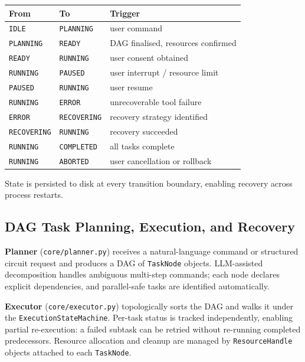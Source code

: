 \documentclass[11pt,a4paper]{article}
\begin{document}
\begin{center}
\small
\renewcommand{\arraystretch}{1.15}
\begin{tabular}{@{}lll@{}}
\toprule
\textbf{From} & \textbf{To} & \textbf{Trigger} \\
\midrule
\texttt{IDLE}       & \texttt{PLANNING}  & user command \\
\texttt{PLANNING}   & \texttt{READY}     & DAG finalised, resources confirmed \\
\texttt{READY}      & \texttt{RUNNING}   & user consent obtained \\
\texttt{RUNNING}    & \texttt{PAUSED}    & user interrupt / resource limit \\
\texttt{PAUSED}     & \texttt{RUNNING}   & user resume \\
\texttt{RUNNING}    & \texttt{ERROR}     & unrecoverable tool failure \\
\texttt{ERROR}      & \texttt{RECOVERING} & recovery strategy identified \\
\texttt{RECOVERING} & \texttt{RUNNING}   & recovery succeeded \\
\texttt{RUNNING}    & \texttt{COMPLETED} & all tasks complete \\
\texttt{RUNNING}    & \texttt{ABORTED}   & user cancellation or rollback \\
\bottomrule
\end{tabular}
\end{center}

State is persisted to disk at every transition boundary, enabling recovery across
process restarts.

\subsection{DAG Task Planning, Execution, and Recovery}

\textbf{Planner} (\texttt{core/planner.py}) receives a natural-language command or
structured circuit request and produces a DAG of \texttt{TaskNode} objects.
LLM-assisted decomposition handles ambiguous multi-step commands; each node
declares explicit dependencies, and parallel-safe tasks are identified
automatically.

\textbf{Executor} (\texttt{core/executor.py}) topologically sorts the DAG and
walks it under the \texttt{ExecutionStateMachine}. Per-task status is tracked
independently, enabling partial re-execution: a failed subtask can be retried
without re-running completed predecessors. Resource allocation and cleanup are
managed by \texttt{ResourceHandle} objects attached to each \texttt{TaskNode}.
\end{document}
